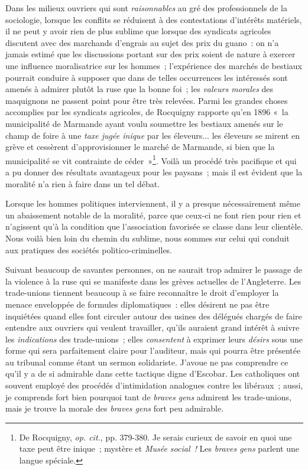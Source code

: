 \documentclass[french,twoside]{book} %
\begin{document}
Dans les milieux ouvriers qui sont \emph{raisonnables} au gré des professionnels de la sociologie, lorsque les conflits se réduisent à des contestations d’intérêts matériels, il ne peut y avoir rien de plus sublime que lorsque des syndicats agricoles discutent avec des marchands d’engrais au sujet des prix du guano : on n’a jamais estimé que les discussions portant sur des prix soient de nature à exercer une influence moralisatrice sur les hommes ; l’expérience des marchés de bestiaux pourrait conduire à supposer que dans de telles occurrences les intéressés sont amenés à admirer plutôt la ruse que la bonne foi ; les \emph{valeurs morales} des maquignons ne passent point pour être très relevées. Parmi les grandes choses accomplies par les syndicats agricoles, de Rocquigny rapporte qu’en 1896 « la municipalité de Marmande ayant voulu soumettre les  bestiaux amenés sur le champ de foire à une \emph{taxe jugée inique} par les éleveurs... les éleveurs se mirent en grève et cessèrent d’approvisionner le marché de Marmande, si bien que la municipalité se vit contrainte de céder »\footnote{ \noindent De Rocquigny, \emph{op. cit.}, pp. 379-380. Je serais curieux de savoir en quoi une taxe peut être inique ; mystère et \emph{Musée social !} Les \emph{braves gens} parlent une langue spéciale.
 }. Voilà un procédé très pacifique et qui a pu donner des résultats avantageux pour les paysans ; mais il est évident que la moralité n’a rien à faire dans un tel débat.\par
Lorsque les hommes politiques interviennent, il y a presque nécessairement même un abaissement notable de la moralité, parce que ceux-ci ne font rien pour rien et n’agissent qu’à la condition que l’association favorisée se classe dans leur clientèle. Nous voilà bien loin du chemin du sublime, nous sommes sur celui qui conduit aux pratiques des sociétés politico-criminelles.\par
Suivant beaucoup de savantes personnes, on ne saurait trop admirer le passage de la violence à la ruse qui se manifeste dans les grèves actuelles de l’Angleterre. Les trade-unions tiennent beaucoup à se faire reconnaître le droit d’employer la menace enveloppée de formules diplomatiques : elles désirent ne pas être inquiétées quand elles font circuler autour des usines des délégués chargés de faire entendre aux ouvriers qui veulent travailler, qu’ils auraient grand intérêt à suivre les \emph{indications} des trade-unions ; elles \emph{consentent} à exprimer leurs \emph{désirs} sous une forme qui sera parfaitement claire pour l’auditeur, mais qui pourra être présentée au tribunal comme étant un sermon solidariste. J’avoue ne pas comprendre  ce qu’il y a de si admirable dans cette tactique digne d’Escobar. Les catholiques ont souvent employé des procédés d’intimidation analogues contre les libéraux ; aussi, je comprends fort bien pourquoi tant de \emph{braves gens} admirent les trade-unions, mais je trouve la morale des \emph{braves gens} fort peu admirable.\par
\end{document}
